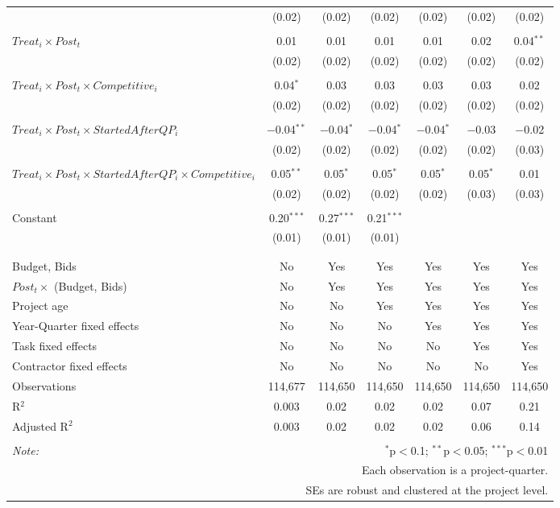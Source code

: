 \documentclass[
]{article}
\begin{document}
\begin{table}[H]
\begin{tabular}{@{\extracolsep{-3pt}}lcccccc}
  & (0.02) & (0.02) & (0.02) & (0.02) & (0.02) & (0.02) \\ 
  & & & & & & \\ 
 $Treat_i \times Post_t$ & 0.01 & 0.01 & 0.01 & 0.01 & 0.02 & 0.04$^{**}$ \\ 
  & (0.02) & (0.02) & (0.02) & (0.02) & (0.02) & (0.02) \\ 
  & & & & & & \\ 
 $Treat_i \times Post_t \times Competitive_i$ & 0.04$^{*}$ & 0.03 & 0.03 & 0.03 & 0.03 & 0.02 \\ 
  & (0.02) & (0.02) & (0.02) & (0.02) & (0.02) & (0.02) \\ 
  & & & & & & \\ 
 $Treat_i \times Post_t \times StartedAfterQP_i$ & $-$0.04$^{**}$ & $-$0.04$^{*}$ & $-$0.04$^{*}$ & $-$0.04$^{*}$ & $-$0.03 & $-$0.02 \\ 
  & (0.02) & (0.02) & (0.02) & (0.02) & (0.02) & (0.03) \\ 
  & & & & & & \\ 
 $Treat_i \times Post_t \times StartedAfterQP_i \times Competitive_i$ & 0.05$^{**}$ & 0.05$^{*}$ & 0.05$^{*}$ & 0.05$^{*}$ & 0.05$^{*}$ & 0.01 \\ 
  & (0.02) & (0.02) & (0.02) & (0.02) & (0.03) & (0.03) \\ 
  & & & & & & \\ 
 Constant & 0.20$^{***}$ & 0.27$^{***}$ & 0.21$^{***}$ &  &  &  \\ 
  & (0.01) & (0.01) & (0.01) &  &  &  \\ 
  & & & & & & \\ 
\hline \\[-1.8ex] 
Budget, Bids & No & Yes & Yes & Yes & Yes & Yes \\ 
$Post_t \times $  (Budget, Bids) & No & Yes & Yes & Yes & Yes & Yes \\ 
Project age & No & No & Yes & Yes & Yes & Yes \\ 
Year-Quarter fixed effects & No & No & No & Yes & Yes & Yes \\ 
Task fixed effects & No & No & No & No & Yes & Yes \\ 
Contractor fixed effects & No & No & No & No & No & Yes \\ 
Observations & 114,677 & 114,650 & 114,650 & 114,650 & 114,650 & 114,650 \\ 
R$^{2}$ & 0.003 & 0.02 & 0.02 & 0.02 & 0.07 & 0.21 \\ 
Adjusted R$^{2}$ & 0.003 & 0.02 & 0.02 & 0.02 & 0.06 & 0.14 \\ 
\hline 
\hline \\[-1.8ex] 
\textit{Note:}  & \multicolumn{6}{r}{$^{*}$p$<$0.1; $^{**}$p$<$0.05; $^{***}$p$<$0.01} \\ 
 & \multicolumn{6}{r}{Each observation is a project-quarter.} \\ 
 & \multicolumn{6}{r}{SEs are robust and clustered at the project level.} \\ 
\end{tabular} 
\end{table}
\end{document}
